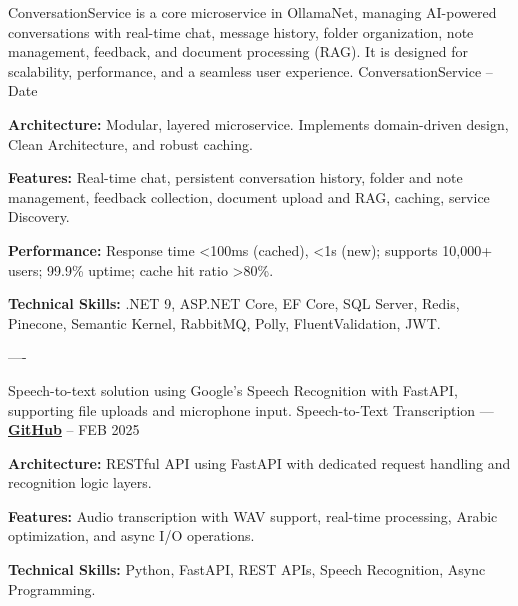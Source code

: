 \begin{cventries}
\cventry
    {ConversationService is a core microservice in OllamaNet, 
    managing AI-powered conversations with real-time chat, message history, folder organization, note management, 
    feedback, and document processing (RAG). It is designed for scalability, performance, 
    and a seamless user experience.}
    {ConversationService}
    {--}
    {Date}
    {
      \begin{cvitems}
        \item \textbf{Architecture:}{ Modular, layered microservice. Implements domain-driven design, Clean Architecture, and robust caching.}
        \item \textbf{Features:}{ Real-time chat, persistent conversation history, folder and note management, feedback collection, document upload and RAG, caching, service Discovery.}
        \item \textbf{Performance:}{ Response time <100ms (cached), <1s (new); supports 10,000+ users; 99.9\% uptime; cache hit ratio >80\%.}
        \item \textbf{Technical Skills:}{ .NET 9, ASP.NET Core, EF Core, SQL Server, Redis, Pinecone, Semantic Kernel, RabbitMQ, Polly, FluentValidation, JWT.}
      \end{cvitems}
    }
    \begin{singlespace}
----
\end{singlespace}


\cventry
    {Speech-to-text solution using Google's Speech Recognition with FastAPI, supporting file uploads and microphone input.} %
    {Speech-to-Text Transcription — \href{https://github.com/ibrhmahmd/audio-recognition}{\color{midnightblue}\textbf{GitHub}} \textrm{\faArrowRight}} %
    {--} %
    {FEB 2025} %
    {
      \begin{cvitems} %
        \item \textbf{Architecture:}{ RESTful API using FastAPI with dedicated request handling and recognition logic layers.}
        \item \textbf{Features:}{ Audio transcription with WAV support, real-time processing, Arabic optimization, and async I/O operations.}
        \item \textbf{Technical Skills:}{ Python, FastAPI, REST APIs, Speech Recognition, Async Programming.}
      \end{cvitems}
    }




\end{cventries}
